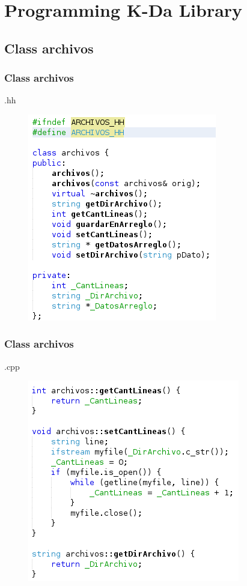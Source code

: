 \documentclass{beamer}
\begin{document}

\section{Programming K-Da Library}
\subsection{Class archivos}

\begin{frame}
\frametitle{Class archivos}
.hh

\begin{figure}
\includegraphics[width=0.4\linewidth]{13.png}
\end{figure}


\end{frame}




\begin{frame}
\frametitle{Class archivos}
.cpp

\begin{figure}
\includegraphics[width=0.4\linewidth]{14.png}
\end{figure}


\end{frame}
\end{document}
